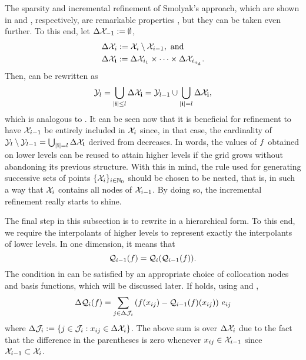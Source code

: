 The sparsity and incremental refinement of Smolyak's approach, which are shown
in  and , respectively, are
remarkable properties \perse, but they can be taken even further. To this end,
let $\Delta\mathcal{X}_{-1} := \emptyset$,
\begin{align*}
  & \Delta\mathcal{X}_i := \mathcal{X}_i \setminus \mathcal{X}_{i - 1}, \text{ and} \\
  & \Delta\mathcal{X}_{\mathbf{i}} := \Delta\mathcal{X}_{i_1} \times \cdots \times \Delta\mathcal{X}_{i_{n_\text{d}}}.
\end{align*}
Then,  can be rewritten as
\begin{equation} \elab{smolyak-grid-incremental}
  \Y_l = \bigcup_{|\vi| \leq \l} \Delta\X_\vi = \Y_{\l - 1} \cup \bigcup_{|\vi| = \l} \Delta\X_\vi,
\end{equation}
which is analogous to . It can be seen now that it is
beneficial for refinement to have $\mathcal{X}_{i - 1}$ be entirely included in $\mathcal{X}_i$
since, in that case, the cardinality of $\mathcal{Y}_l \setminus \mathcal{Y}_{l - 1} =
\bigcup_{|\mathbf{i}| = l} \Delta\mathcal{X}_{\mathbf{i}}$ derived from 
decreases. In words, the values of $f$ obtained on lower levels can be reused
to attain higher levels if the grid grows without abandoning its previous
structure. With this in mind, the rule used for generating successive sets of
points $\{ \mathcal{X}_i \}_{i \in \mathbb{N}_0}$ should be chosen to be nested, that is, in
such a way that $\mathcal{X}_i$ contains all nodes of $\mathcal{X}_{i - 1}$. By doing so, the
incremental refinement really starts to shine.

The final step in this subsection is to rewrite  in a
hierarchical form. To this end, we require the interpolants of higher levels to
represent exactly the interpolants of lower levels. In one dimension, it means
that
\begin{equation} \elab{tensor-exactness}
  \tensor{i - 1}(\f) = \tensor{i}(\tensor{i - 1}(\f)).
\end{equation}
The condition in  can be satisfied by an appropriate
choice of collocation nodes and basis functions, which will be discussed later.
If  holds, using  and
,
\[
  \Delta\mathcal{Q}_{i}(f) = \sum_{j \in \Delta\mathcal{J}_i} \left( f(x_{ij}) - \mathcal{Q}_{i - 1}(f)(x_{ij}) \right) \, e_{ij}
\]
where $\Delta\mathcal{J}_i := \{ j \in \mathcal{J}_i: x_{ij} \in \Delta\mathcal{X}_i \}$. The
above sum is over $\Delta\mathcal{X}_i$ due to the fact that the difference in the
parentheses is zero whenever $x_{ij} \in \mathcal{X}_{i - 1}$ since $\mathcal{X}_{i - 1} \subset
\mathcal{X}_i$.

